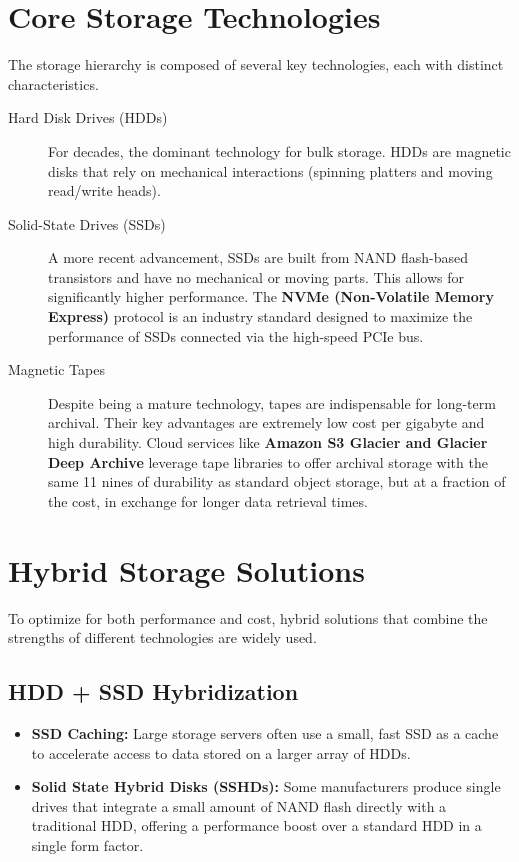 \section{Core Storage Technologies}
The storage hierarchy is composed of several key technologies, each with distinct characteristics.

\begin{description}
    \item[Hard Disk Drives (HDDs)] For decades, the dominant technology for bulk storage. HDDs are magnetic disks that rely on mechanical interactions (spinning platters and moving read/write heads).
    \item[Solid-State Drives (SSDs)] A more recent advancement, SSDs are built from NAND flash-based transistors and have no mechanical or moving parts. This allows for significantly higher performance. The \textbf{NVMe (Non-Volatile Memory Express)} protocol is an industry standard designed to maximize the performance of SSDs connected via the high-speed PCIe bus.
    \item[Magnetic Tapes] Despite being a mature technology, tapes are indispensable for long-term archival. Their key advantages are extremely low cost per gigabyte and high durability. Cloud services like \textbf{Amazon S3 Glacier and Glacier Deep Archive} leverage tape libraries to offer archival storage with the same 11 nines of durability as standard object storage, but at a fraction of the cost, in exchange for longer data retrieval times.
\end{description}

\section{Hybrid Storage Solutions}
To optimize for both performance and cost, hybrid solutions that combine the strengths of different technologies are widely used.

\subsection{HDD + SSD Hybridization}
\begin{itemize}
    \item \textbf{SSD Caching:} Large storage servers often use a small, fast SSD as a cache to accelerate access to data stored on a larger array of HDDs.
    \item \textbf{Solid State Hybrid Disks (SSHDs):} Some manufacturers produce single drives that integrate a small amount of NAND flash directly with a traditional HDD, offering a performance boost over a standard HDD in a single form factor.
\end{itemize}

